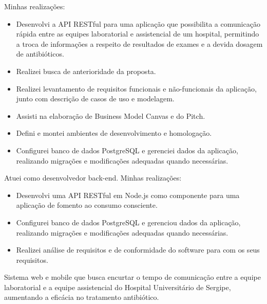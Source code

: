 \documentclass[10pt,a4paper,ragged2e,withhyper]{altacv}
\begin{document}
\begin{paracol}{2}
Minhas realizações:
\begin{itemize}
\item Desenvolvi a API RESTful para uma aplicação que possibilita a comunicação rápida entre as equipes laboratorial e assistencial de um hospital, permitindo a troca de informações a respeito de resultados de exames e a devida dosagem de antibióticos.
\item Realizei busca de anterioridade da proposta.
\item Realizei levantamento de requisitos funcionais e não-funcionais da aplicação, junto com descrição de casos de uso e modelagem.
\item Assisti na elaboração de Business Model Canvas e do Pitch.
\item Defini e montei ambientes de desenvolvimento e homologação.
\item Configurei banco de dados PostgreSQL e gerenciei dados da aplicação, realizando migrações e modificações adequadas quando necessárias.
\end{itemize}


\newpage

\par\divider
{}

Atuei como desenvolvedor back-end. Minhas realizações:
\begin{itemize}
\item Desenvolvi uma API RESTful em Node.js como componente para uma aplicação de fomento ao consumo consciente.
\item Configurei banco de dados PostgreSQL e gerenciou dados da aplicação, realizando migrações e modificações adequadas quando necessárias.
\item Realizei análise de requisitos e de conformidade do software para com os seus requisitos.
\end{itemize}

\newpage
\switchcolumn
{}
\label{sec:orgabe5d32}

Sistema web e mobile que busca encurtar o tempo de comunicação entre a equipe laboratorial e a equipe assistencial do Hospital Universitário de Sergipe, aumentando a eficácia no tratamento antibiótico.


\end{paracol}
\end{document}
